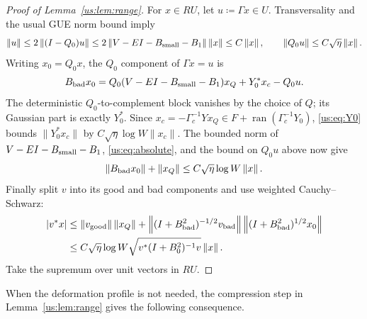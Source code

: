 \documentclass[11pt]{article}
\numberwithin{equation}{section}
\theoremstyle{remark}
\newcommand{\ran}{\operatorname{ran}}
\newcommand{\norm}[1]{\left\|#1\right\|}
\begin{document}
\begin{proof}[Proof of Lemma~\ref{us:lem:range}]
For $x\in RU$, let $u\coloneqq \Gamma x\in U$. Transversality and the usual GUE
norm bound imply
\[
 \norm u\le2\norm{(I-Q_0)u}
 \le2\norm{V-EI-B_{\rm small}-B_1}\norm x\le C\norm x,
 \qquad \norm{Q_0u}\le C\sqrt\eta\norm x.
\]
Writing $x_0=Q_0x$, the $Q_0$ component of $\Gamma x=u$ is
\[
 B_{\rm bad}x_0
 =Q_0(V-EI-B_{\rm small}-B_1)x_Q+Y_0^*x_c-Q_0u.
\]
The deterministic $Q_0$-to-complement block vanishes by the choice of $Q$;
its Gaussian part is exactly $Y_0^*$.
Since $x_c=-\Gamma_c^{-1}Yx_Q\in F+\ran(\Gamma_c^{-1}Y_0)$,
\eqref{us:eq:Y0} bounds $\|Y_0^*x_c\|$ by
$C\sqrt\eta\log W\|x_c\|$. The bounded norm of
$V-EI-B_{\rm small}-B_1$, \eqref{us:eq:absolute}, and the bound on $Q_0u$
above now give
\begin{equation}
 \norm{B_{\rm bad}x_0}+\norm{x_Q}
 \le C\sqrt\eta\log W\norm x.
 \label{us:eq:weightedcompression}
\end{equation}
Finally split $v$ into its good
and bad components and use weighted Cauchy--Schwarz:
\[
 \begin{aligned}
 |v^*x|&\le \norm{v_{\rm good}}\norm{x_Q}
 +\norm{(I+B_{\rm bad}^2)^{-1/2}v_{\rm bad}}
  \norm{(I+B_{\rm bad}^2)^{1/2}x_0}\\
 &\le C\sqrt\eta\log W\sqrt{v^*(I+B_0^2)^{-1}v}\norm x.
 \end{aligned}
\]
Take the supremum over unit vectors in $RU$.
\end{proof}


When the deformation profile is not needed, the compression step in
Lemma~\ref{us:lem:range} gives the following consequence.
\end{document}
